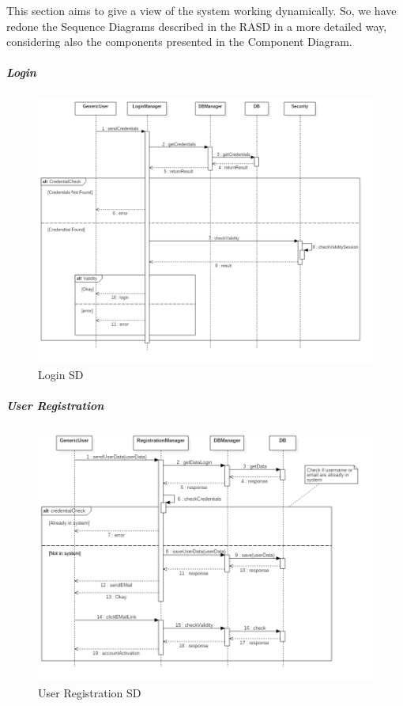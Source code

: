 This section aims to give a view of the system working dynamically. So, we have redone the Sequence Diagrams described in the RASD in a more detailed way, considering also the components presented in the Component Diagram.

\subparagraph{Login}
    \begin{figure}[H]
        \centering
        \includegraphics[width=18cm, angle =90]{./Images/SD_Login.png}
        \caption{Login SD}
    \end{figure}

\subparagraph{User Registration}
    \begin{figure}[H]
        \centering
        \includegraphics[width=18cm, angle =90]{./Images/SD_Registration.png}
        \caption{User Registration SD}
    \end{figure}  

